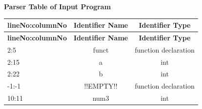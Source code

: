 \documentclass{article}
\begin{document}
\begin{center}
    {\LARGE \textbf{Parser Table of Input Program}} \\[10pt]
\end{center}

\renewcommand{\arraystretch}{1.3}
\setlength{\arrayrulewidth}{0.7mm}
\begin{longtable}{|l|c|c|}
    \hline
    \rowcolor{headercolor} \textbf{lineNo:columnNo} & \textbf{Identifier Name} & \textbf{Identifier Type} \\ 
    \hline
    \endfirsthead
    \hline
    \rowcolor{headercolor} \textbf{lineNo:columnNo} & \textbf{Identifier Name} & \textbf{Identifier Type} \\ 
    \hline
    \endhead
    2:5 & funct & function declaration \\ 
    \hline
    2:15 & a & int \\ 
    \hline
    2:22 & b & int \\ 
    \hline
    -1:-1 & !!EMPTY!! & function declaration \\ 
    \hline
    10:11 & num3 & int \\ 
    \hline
\end{longtable}
\end{document}
